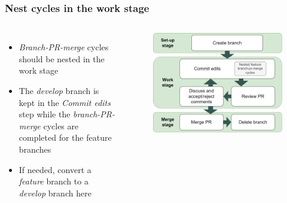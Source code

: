 \documentclass[aspectratio=169]{beamer} %
\begin{document}
\begin{frame}
	\frametitle{Nest cycles in the work stage}
	\begin{columns}[c]
		
		\begin{itemize}
			\setlength\itemsep{1em}
			\item \textit{Branch-PR-merge} cycles should be nested
			in the work stage
			\item The \textit{develop} branch is kept
			in the \textit{Commit edits} step while
			the \textit{branch-PR-merge} cycles are completed
			for the feature branches
			\item If needed, convert a \textit{feature} branch
			to a \textit{develop} branch here
		\end{itemize}
		
		\vspace{-.75cm}
		\begin{figure}
			\centering
			\includegraphics[width=\textwidth]{./img/nested-branch-pr-merge-cycle.png}
		\end{figure}
	\end{columns}
\end{frame}
\end{document}
